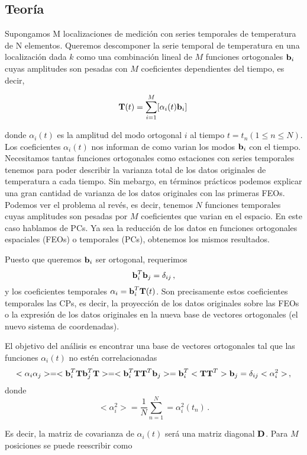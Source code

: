 \documentclass[
]{agujournal2019}
\begin{document}
\subsection{Teoría}\label{teoruxeda}

Supongamos M localizaciones de medición con series temporales de
temperatura de N elementos. Queremos descomponer la serie temporal de
temperatura en una localización dada \(k\) como una combinación lineal
de \(M\) funciones ortogonales \({\textbf b}_i\) cuyas amplitudes son
pesadas con \(M\) coeficientes dependientes del tiempo, es decir,

\[
{\textbf T}(t)=\sum\limits^M_{i=1}[\alpha_i(t){\textbf b}_{i}]\,\]

donde \(\alpha_i(t)\) es la amplitud del modo ortogonal \(i\) al tiempo
\(t=t_n(1\le n\le N)\). Los coeficientes \(\alpha_i(t)\) nos informan de
como varian los modos \({\textbf b}_{i}\) con el tiempo. Necesitamos
tantas funciones ortogonales como estaciones con series temporales
tenemos para poder describir la varianza total de los datos originales
de temperatura a cada tiempo. Sin mebargo, en términos prácticos podemos
explicar una gran cantidad de varianza de los datos originales con las
primeras FEOs. Podemos ver el problema al revés, es decir, tenemos \(N\)
funciones temporales cuyas amplitudes son pesadas por \(M\) coeficientes
que varian en el espacio. En este caso hablamos de PCs. Ya sea la
reducción de los datos en funciones ortogonales espaciales (FEOs) o
temporales (PCs), obtenemos los mismos resultados.

Puesto que queremos \({\textbf b}_{i}\) ser ortogonal, requerimos
\[{\textbf b}^T_i {\textbf b}_{j}=\delta_{ij}\,,\] y los coeficientes
temporales \(\alpha_i={\textbf b}^T_{i}{\textbf T}(t)\). Son
precisamente estos coeficientes temporales las CPs, es decir, la
proyección de los datos originales sobre las FEOs o la expresión de los
datos originales en la nueva base de vectores ortogonales (el nuevo
sistema de coordenadas).

El objetivo del análisis es encontrar una base de vectores ortogonales
tal que las funciones \(\alpha_i(t)\) no estén correlacionadas \[
<\alpha_i \alpha_j>=<{\textbf b}^T_{i}{\textbf T}{\textbf b}^T_{j}{\textbf T}>=<{\textbf b}^T_{i}{\textbf T}{\textbf T}^T{\textbf b}_{j}>={\textbf b}^T_{i}<{\textbf T} {\textbf T}^T>{\textbf b}_{j}=\delta_{ij}<\alpha^2_i>\,,\]
donde \[<\alpha_i^2>=\frac{1}{N}\sum\limits^N_{n=1}=\alpha^2_i(t_n)\,.\]

Es decir, la matriz de covarianza de \(\alpha_i(t)\) será una matriz
diagonal \({\textbf D}\). Para \(M\) posiciones se puede reescribir como
\end{document}
